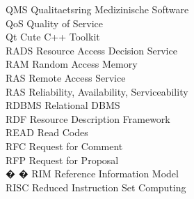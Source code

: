 \begin{tabbing}
    \>QMS \>\>Qualitaetsring Medizinische Software\\

    \>QoS \>\>Quality of Service\\

    \>Qt \>\>Cute C++ Toolkit\\




    \>RADS \>\>Resource Access Decision Service\\

    \>RAM \>\>Random Access Memory\\


    \>RAS \>\>Remote Access Service\\

    \>RAS \>\>Reliability, Availability, Serviceability\\

    \>RDBMS \>\>Relational DBMS\\

    \>RDF \>\>Resource Description Framework\\


    \>READ \>\>Read Codes\\


    \>RFC \>\>Request for Comment\\

    \>RFP \>\>Request for Proposal\\

� � \>RIM \>\>Reference Information Model\\



    \>RISC \>\>Reduced Instruction Set Computing\\


\end{tabbing}
